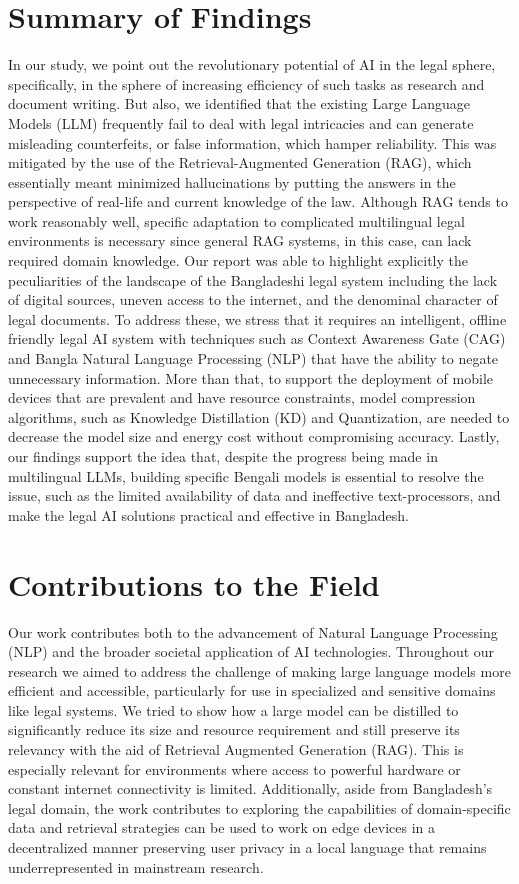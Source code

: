 \section{Summary of Findings}
In our study, we point out the revolutionary potential of AI in the legal sphere, specifically, in the sphere of increasing efficiency of such tasks as research and document writing. But also, we identified that the existing Large Language Models (LLM) frequently fail to deal with legal intricacies and can generate misleading counterfeits, or false information, which hamper reliability. This was mitigated by the use of the Retrieval-Augmented Generation (RAG), which essentially meant minimized hallucinations by putting the answers in the perspective of real-life and current knowledge of the law. Although RAG tends to work reasonably well, specific adaptation to complicated multilingual legal environments is necessary since general RAG systems, in this case, can lack required domain knowledge. Our report was able to highlight explicitly the peculiarities of the landscape of the Bangladeshi legal system including the lack of digital sources, uneven access to the internet, and the denominal character of legal documents. To address these, we stress that it requires an intelligent, offline friendly legal AI system with techniques such as Context Awareness Gate (CAG) and  Bangla Natural Language Processing (NLP) that have the ability to negate unnecessary information. More than that, to support the deployment of mobile devices that are prevalent and have resource constraints, model compression algorithms, such as Knowledge Distillation (KD) and Quantization, are needed to decrease the model size and energy cost without compromising accuracy. Lastly, our findings support the idea that, despite the progress being made in multilingual LLMs, building specific Bengali models is essential to resolve the issue, such as the limited availability of data and ineffective text-processors, and make the legal AI solutions practical and effective in Bangladesh.

\section{Contributions to the Field}
Our work contributes both to the advancement of Natural Language Processing (NLP) and the broader societal application of AI technologies. Throughout our research we aimed to address the challenge of making large language models more efficient and accessible, particularly for use in specialized and sensitive domains like legal systems. We tried to show how a large model can be distilled to significantly reduce its size and resource requirement and still preserve its relevancy with the aid of Retrieval Augmented Generation (RAG). This is especially relevant for environments where access to powerful hardware or constant internet connectivity is limited. Additionally, aside from Bangladesh's legal domain, the work contributes to exploring the capabilities of domain-specific data and retrieval strategies can be used to work on edge devices in a decentralized manner preserving user privacy in a local language that remains underrepresented in mainstream research. 
